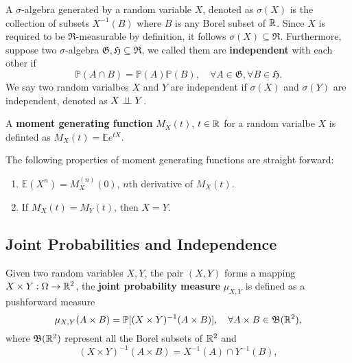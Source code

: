 \begin{definition}
A $\sigma$-algebra generated by a random variable $X$, denoted as $\sigma(X)$ is the collection of subsets $X^{-1}(B)$ where $B$ is any Borel subset of $\mathbb{R}$. Since $X$ is required to be $\mathfrak{R}$-measurable by definition, it follows $\sigma(X)\subseteq\mathfrak{R}$. Furthermore, suppose two $\sigma$-algebra $\mathfrak{G,H}\subseteq\mathfrak{R}$, we called them are \textbf{independent} with each other if
	\begin{equation}
	\mathbb{P}(A\cap B)=\mathbb{P}(A)\mathbb{P}(B),\quad \forall A\in\mathfrak{G}, \forall B\in\mathfrak{H}.
	\label{eq:def_independence}
	\end{equation}
We say two random varialbes $X$ and $Y$ are independent if $\sigma(X)$ and $\sigma(Y)$ are independent, denoted as $X\perp\!\!\!\perp Y$.
\end{definition}

\begin{definition}
A \textbf{moment generating function} $M_X(t)$, $t\in\mathbb{R}$ for a random varialbe $X$ is definted as $M_X(t)=\mathbb{E}e^{tX}$.
\end{definition}

\begin{theorem}
The following properties of moment generating functions are straight forward:
	\begin{enumerate}
	\item $\mathbb{E}(X^n)=M_X^{(n)}(0)$, $n$th derivative of $M_X(t)$.
	\item If $M_X(t)=M_Y(t)$, then $X=Y$.
	\end{enumerate}
	\label{th:mgf}
\end{theorem}



\subsection{Joint Probabilities and Independence}
\begin{definition}
Given two random variables $X,Y$, the pair $(X,Y)$ forms a mapping $X\times Y:\Omega\to\mathbb{R}^2$, the \textbf{joint probability measure} $\mu_{X,Y}$ is defined as a pushforward measure
\begin{equation}
\mu_{X,Y}(A\times B)=\mathbb{P}[(X\times Y)^{-1}(A\times B)], \quad \forall A\times B\in\mathfrak{B}(\mathbb{R}^2),
\end{equation}
where $\mathfrak{B}(\mathbb{R}^2)$ represent all the Borel subsets of $\mathbb{R}^2$ and
\begin{equation}
(X\times Y)^{-1}(A\times B) = X^{-1}(A)\cap Y^{-1}(B),
\end{equation}
\end{definition}

